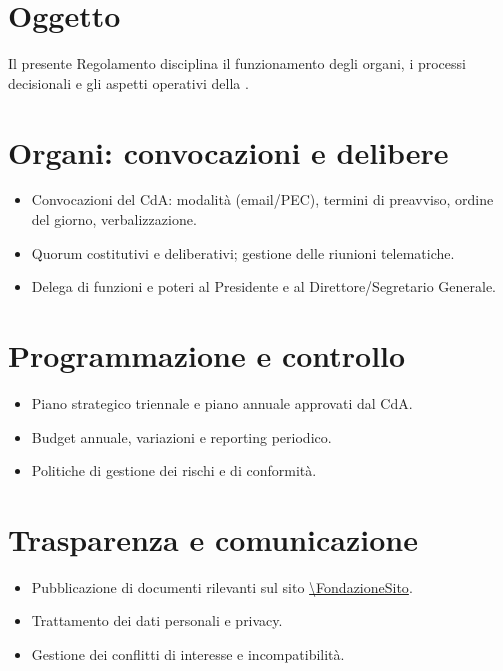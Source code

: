 \maketitle

\section*{Oggetto}
Il presente Regolamento disciplina il funzionamento degli organi, i processi decisionali e gli aspetti operativi della \FondazioneNome.

\section*{Organi: convocazioni e delibere}
\begin{itemize}
  \item Convocazioni del CdA: modalità (email/PEC), termini di preavviso, ordine del giorno, verbalizzazione.
  \item Quorum costitutivi e deliberativi; gestione delle riunioni telematiche.
  \item Delega di funzioni e poteri al Presidente e al Direttore/Segretario Generale.
\end{itemize}

\section*{Programmazione e controllo}
\begin{itemize}
  \item Piano strategico triennale e piano annuale approvati dal CdA.
  \item Budget annuale, variazioni e reporting periodico.
  \item Politiche di gestione dei rischi e di conformità.
\end{itemize}

\section*{Trasparenza e comunicazione}
\begin{itemize}
  \item Pubblicazione di documenti rilevanti sul sito \url{\FondazioneSito}.
  \item Trattamento dei dati personali e privacy.
  \item Gestione dei conflitti di interesse e incompatibilità.
\end{itemize}

